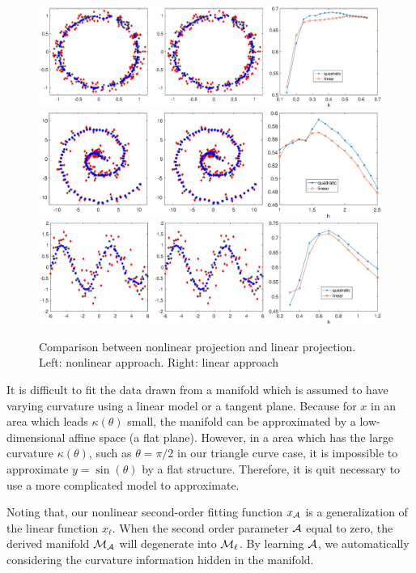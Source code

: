 \documentclass[aos,preprint]{imsart}
\theoremstyle{remark}
\begin{document}
\begin{figure}[t] %
   \centering
    \includegraphics[width=\linewidth]{circle_result.eps} 
     \includegraphics[width=\linewidth]{swiss_roll.eps} 
     \includegraphics[width=\linewidth]{sin_curve2.eps} 
   \caption{Comparison between nonlinear projection and linear projection. Left: nonlinear approach. Right: linear approach}
   \label{fig:sin_curve}
\end{figure}

It is difficult to fit the data drawn from a manifold which is assumed to have varying curvature using a linear model or a tangent plane. Because for $x$ in an area which leads $\kappa(\theta)$ small, the manifold can be approximated by a low-dimensional affine space (a flat plane). However, in a area which has the large curvature $\kappa(\theta)$, such as $\theta=\pi/2$ in our triangle curve case, it is impossible to approximate $y = \sin(\theta)$ by a flat structure. Therefore, it is quit necessary to use a more complicated model to approximate. 

Noting that, our nonlinear second-order fitting function $x_{\cal A}$ is a generalization of the linear function $x_\ell$. When the second order parameter $\cal A$ equal to zero, the derived manifold $\cal M_A$ will degenerate into ${\cal M}_\ell$. By learning $\cal A$, we automatically considering the curvature information hidden in the manifold.
\end{document}
